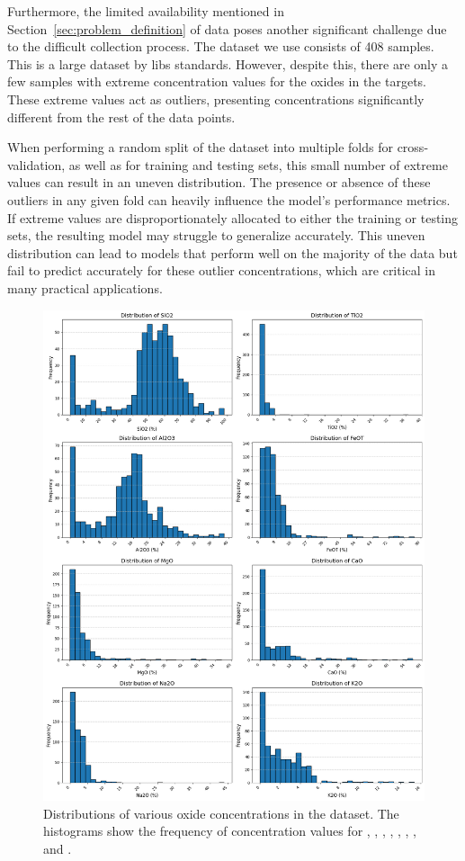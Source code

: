 Furthermore, the limited availability mentioned in Section~\ref{sec:problem_definition} of data poses another significant challenge due to the difficult collection process.
The dataset we use consists of 408 samples. This is a large dataset by \gls{libs} standards.
However, despite this, there are only a few samples with extreme concentration values for the oxides in the targets.
These extreme values act as outliers, presenting concentrations significantly different from the rest of the data points.

When performing a random split of the dataset into multiple folds for cross-validation, as well as for training and testing sets, this small number of extreme values can result in an uneven distribution.
The presence or absence of these outliers in any given fold can heavily influence the model's performance metrics.
If extreme values are disproportionately allocated to either the training or testing sets, the resulting model may struggle to generalize accurately.
This uneven distribution can lead to models that perform well on the majority of the data but fail to predict accurately for these outlier concentrations, which are critical in many practical applications.

\begin{figure}[h!]
    \centering
    \includegraphics[width=\textwidth]{images/oxide_distributions.png}
    \caption{Distributions of various oxide concentrations in the dataset. The histograms show the frequency of concentration values for , , , , , , , and .}
    \label{fig:oxide_distributions}
\end{figure}

